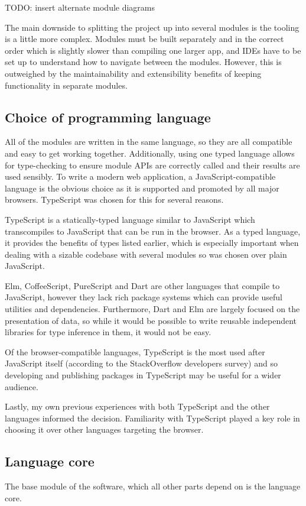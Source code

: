 \documentclass[a4paper,fleqn,oneside,12pt]{report}
\begin{document}
TODO: insert alternate module diagrams

The main downside to splitting the project up into several modules is the tooling is a little more complex. Modules must be built separately and in the correct order which is slightly slower than compiling one larger app, and IDEs have to be set up to understand how to navigate between the modules. However, this is outweighed by the maintainability and extensibility benefits of keeping functionality in separate modules.

\subsection{Choice of programming language}\label{id:h.dj2rwwqr30vu}
All of the modules are written in the same language, so they are all compatible and easy to get working together. Additionally, using one typed language allows for type-checking to ensure module APIs are correctly called and their results are used sensibly. To write a modern web application, a JavaScript-compatible language is the obvious choice as it is supported and promoted by all major browsers. TypeScript was chosen for this for several reasons.

TypeScript is a statically-typed language similar to JavaScript which transcompiles to JavaScript that can be run in the browser. As a typed language, it provides the benefits of types listed earlier, which is especially important when dealing with a sizable codebase with several modules so was chosen over plain JavaScript.

Elm, CoffeeScript, PureScript and Dart are other languages that compile to JavaScript, however they lack rich package systems which can provide useful utilities and dependencies. Furthermore, Dart and Elm are largely focused on the presentation of data, so while it would be possible to write reusable independent libraries for type inference in them, it would not be easy.

Of the browser-compatible languages, TypeScript is the most used after JavaScript itself (according to the StackOverflow developers survey) and so developing and publishing packages in TypeScript may be useful for a wider audience.

Lastly, my own previous experiences with both TypeScript and the other languages informed the decision. Familiarity with TypeScript played a key role in choosing it over other languages targeting the browser.
\subsection{Language core}\label{id:h.hggmfighusoc}
The base module of the software, which all other parts depend on is the language core.
\end{document}
